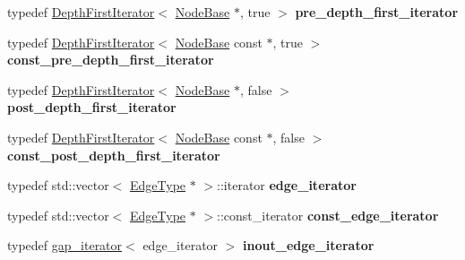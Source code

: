 \begin{DoxyCompactItemize}
\item 
\mbox{\label{classNodeBase_ae396694fda7ed00f26ebda9551bb143e}} 
typedef \mbox{\hyperlink{classDepthFirstIterator}{Depth\+First\+Iterator}}$<$ \mbox{\hyperlink{classNodeBase}{Node\+Base}} $\ast$, true $>$ {\bfseries pre\+\_\+depth\+\_\+first\+\_\+iterator}
\item 
\mbox{\label{classNodeBase_a19d193fcc0f567cbf9d8a6d6b1f2e5b6}} 
typedef \mbox{\hyperlink{classDepthFirstIterator}{Depth\+First\+Iterator}}$<$ \mbox{\hyperlink{classNodeBase}{Node\+Base}} const  $\ast$, true $>$ {\bfseries const\+\_\+pre\+\_\+depth\+\_\+first\+\_\+iterator}
\item 
\mbox{\label{classNodeBase_a19ed5f5cce72879d7102b5a397a788f1}} 
typedef \mbox{\hyperlink{classDepthFirstIterator}{Depth\+First\+Iterator}}$<$ \mbox{\hyperlink{classNodeBase}{Node\+Base}} $\ast$, false $>$ {\bfseries post\+\_\+depth\+\_\+first\+\_\+iterator}
\item 
\mbox{\label{classNodeBase_a2a43b5eb2c8a5b450a69e5eea98a9d94}} 
typedef \mbox{\hyperlink{classDepthFirstIterator}{Depth\+First\+Iterator}}$<$ \mbox{\hyperlink{classNodeBase}{Node\+Base}} const  $\ast$, false $>$ {\bfseries const\+\_\+post\+\_\+depth\+\_\+first\+\_\+iterator}
\item 
\mbox{\label{classNodeBase_a8ec3e13b077068345863f24eea64967b}} 
typedef std\+::vector$<$ \mbox{\hyperlink{classEdge}{Edge\+Type}} $\ast$ $>$\+::iterator {\bfseries edge\+\_\+iterator}
\item 
\mbox{\label{classNodeBase_a5938c9b9f7e75fbb99d3c400fc325eb8}} 
typedef std\+::vector$<$ \mbox{\hyperlink{classEdge}{Edge\+Type}} $\ast$ $>$\+::const\+\_\+iterator {\bfseries const\+\_\+edge\+\_\+iterator}
\item 
\mbox{\label{classNodeBase_ae79b3fca453d0c6ba86ae664942e36c7}} 
typedef \mbox{\hyperlink{classgap__iterator}{gap\+\_\+iterator}}$<$ edge\+\_\+iterator $>$ {\bfseries inout\+\_\+edge\+\_\+iterator}
\end{DoxyCompactItemize}
